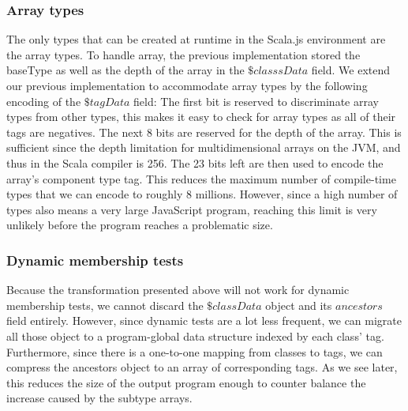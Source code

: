 \subsubsection{Array types}
The only types that can be created at runtime in the Scala.js environment are
the array types. To handle array, the previous implementation stored the
baseType as well as the depth of the array in the $\$classsData$ field. We
extend our previous implementation to accommodate array types by the following
encoding of the $\$tagData$ field: The first bit is reserved to discriminate
array types from other types, this makes it easy to check for array types as
all of their tags are negatives. The next 8 bits are reserved for the depth of
the array. This is sufficient since the depth limitation for
multidimensional arrays on the JVM, and thus in the Scala compiler is 256. The
23 bits left are then used to encode the array's component type tag. This
reduces the maximum number of compile-time types that we can encode to roughly
8 millions. However, since a high number of types also means a very large
JavaScript program, reaching this limit is very unlikely before the program
reaches a problematic size.

\subsubsection{Dynamic membership tests}
Because the transformation presented above will not work for dynamic membership
tests, we cannot discard the $\$classData$ object and its $ancestors$ field
entirely. However, since dynamic tests are a lot less frequent, we can migrate
all those object to a program-global data structure indexed by each class' tag.
Furthermore, since there is a one-to-one mapping from classes to tags, we can
compress the ancestors object to an array of corresponding tags. As we see
later, this reduces the size of the output program enough to counter balance
the increase caused by the subtype arrays.



